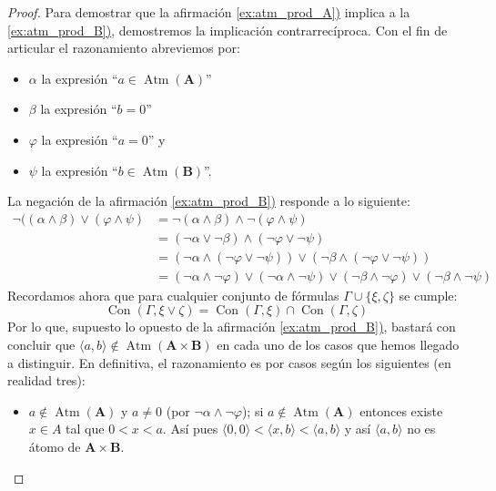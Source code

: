 \begin{proof}
  Para demostrar que la afirmación \hyperref[ex:atm_prod_A]{\ref*{ex:atm_prod_A})}
  implica a la \hyperref[ex:atm_prod_B]{\ref*{ex:atm_prod_B})},
  demostremos la implicación contrarrecíproca. Con el fin de articular
  el razonamiento abreviemos por:
  \begin{itemize}
  \item $\alpha$ la expresión ``$a\in
    \operatorname{Atm}(\mathbf{A})$''
  \item $\beta$ la expresión ``$b=0$''
  \item $\varphi$ la expresión ``$a=0$'' y
  \item $\psi$ la expresión
    ``$b\in \operatorname{Atm}(\mathbf{B})$''.
  \end{itemize}
  La negación de la afirmación
  \hyperref[ex:atm_prod_B]{\ref*{ex:atm_prod_B})} responde a lo
  siguiente:
  \begin{align*}
    \neg((\alpha\wedge\beta)\vee (\varphi\wedge\psi)&=
        \neg(\alpha\wedge\beta)\wedge\neg (\varphi\wedge\psi)\\
    &=(\neg\alpha\vee\neg\beta)\wedge(\neg\varphi\vee\neg\psi)\\
    &=(\neg\alpha\wedge(\neg\varphi\vee\neg\psi))
    \vee (\neg\beta\wedge(\neg\varphi\vee\neg\psi))\\
    &=(\neg\alpha\wedge\neg\varphi)\vee(\neg\alpha\wedge\neg\psi)
    \vee(\neg\beta\wedge\neg\varphi)\vee(\neg\beta\wedge\neg\psi)
  \end{align*}
Recordamos ahora que para cualquier conjunto de fórmulas
$\Gamma\cup\{\xi,\zeta\}$ se cumple: 
\begin{equation*}
 \operatorname{Con}(\Gamma,\xi\vee\zeta)=
\operatorname{Con}(\Gamma,\xi)\cap\operatorname{Con}(\Gamma,\zeta) 
\end{equation*}
Por lo que, supuesto lo opuesto de la afirmación
\hyperref[ex:atm_prod_B]{\ref*{ex:atm_prod_B})}, bastará con concluir
que
$\langle a,b\rangle\notin
\operatorname{Atm}(\mathbf{A}\times\mathbf{B})$ en cada uno de los
casos que hemos llegado a distinguir. En definitiva, el razonamiento
es por casos según los siguientes (en realidad tres):
\begin{itemize}
\item $a\notin\operatorname{Atm}(\mathbf{A})$ y $a\neq 0$ (por
  $\neg\alpha\wedge\neg\varphi$); si
  $a\notin\operatorname{Atm}(\mathbf{A})$ entonces existe $x\in A$ tal
  que $0<x<a$. Así pues
  $\langle 0,0\rangle<\langle x,b\rangle<\langle a,b\rangle$ y
  así $\langle a,b\rangle$ no es átomo de $\mathbf{A}\times\mathbf{B}$.

\end{itemize}
\end{proof}
